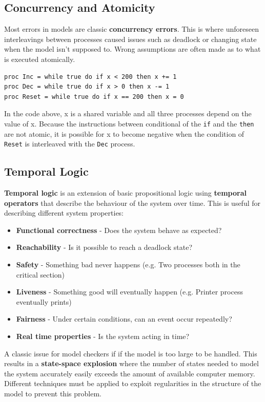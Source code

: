 \documentclass[11pt]{article}
\begin{document}
\subsection{Concurrency and Atomicity}
Most errors in models are classic \textbf{concurrency errors}. This is where unforeseen interleavings between processes caused issues such as deadlock or changing state when the model isn't supposed to. Wrong assumptions are often made as to what is executed atomically. 
\\
\begin{lstlisting}[caption={Concurrency example in pseudocode}, captionpos=b]
proc Inc = while true do if x < 200 then x += 1
proc Dec = while true do if x > 0 then x -= 1
proc Reset = while true do if x == 200 then x = 0
\end{lstlisting}
\noindent
In the code above, x is a shared variable and all three processes depend on the value of x. Because the instructions between conditional of the \texttt{if} and the \texttt{then} are not atomic, it is possible for x to become negative when the condition of \texttt{Reset} is interleaved with the \texttt{Dec} process. 

\subsection{Temporal Logic}
\textbf{Temporal logic} is an extension of basic propositional logic using \textbf{temporal operators} that describe the behaviour of the system over time. This is useful for describing different system properties:
\begin{itemize}
\item \textbf{Functional correctness} - Does the system behave as expected?
\item \textbf{Reachability} - Is it possible to reach a deadlock state?
\item \textbf{Safety} - Something bad never happens (e.g. Two processes both in the critical section)
\item \textbf{Liveness} - Something good will eventually happen (e.g. Printer process eventually prints)
\item \textbf{Fairness} - Under certain conditions, can an event occur repeatedly?
\item \textbf{Real time properties} - Is the system acting in time?
\end{itemize}
\noindent
A classic issue for model checkers if if the model is too large to be handled. This results in a \textbf{state-space explosion} where the number of states needed to model the system accurately easily exceeds the amount of available computer memory. Different techniques must be applied to exploit regularities in the structure of the model to prevent this problem.
\end{document}
